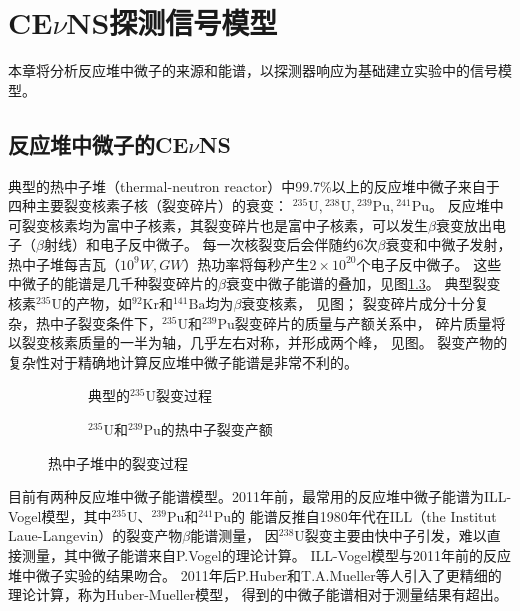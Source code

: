 
\chapter{CE$\nu$NS探测信号模型}

本章将分析反应堆中微子的来源和能谱，以探测器响应为基础建立实验中的信号模型。

\section{反应堆中微子的CE$\nu$NS}

典型的热中子堆（thermal-neutron reactor）中99.7\%以上的反应堆中微子来自于四种主要裂变核素子核（裂变碎片）的衰变：
${}^{235}\mathrm{U},{}^{238}\mathrm{U},{}^{239}\mathrm{Pu},{}^{241}\mathrm{Pu}$\cite{juno_collaboration_tao_2020}。
反应堆中可裂变核素均为富中子核素，其裂变碎片也是富中子核素，可以发生$\beta$衰变放出电子（$\beta$射线）和电子反中微子。
每一次核裂变后会伴随约6次$\beta$衰变和中微子发射，热中子堆每吉瓦（$10^{9}\si{W},\si{GW}$）热功率将每秒产生$2\times10^{20}$个电子反中微子。
这些中微子的能谱是几千种裂变碎片的$\beta$衰变中微子能谱的叠加，见图\ref{fig:fission}。
典型裂变核素${}^{235}\mathrm{U}$的产物，如${}^{92}\mathrm{Kr}$和${}^{141}\mathrm{Ba}$均为$\beta$衰变核素，
见图；
裂变碎片成分十分复杂，热中子裂变条件下，${}^{235}\mathrm{U}$和${}^{239}\mathrm{Pu}$裂变碎片的质量与产额关系中，
碎片质量将以裂变核素质量的一半为轴，几乎左右对称，并形成两个峰\cite{crouch_fission-product_1977}，
见图。
裂变产物的复杂性对于精确地计算反应堆中微子能谱是非常不利的。

\begin{figure}
  \begin{subfigure}{.35\textwidth}
    \centering
    
    \caption{\label{fig:nuclear_fission} 典型的${}^{235}\mathrm{U}$裂变过程\cite{noauthor_nuclear_2021}}
  \end{subfigure}
  \begin{subfigure}{.65\textwidth}
    \centering
    
    \caption{\label{fig:fission_yield} ${}^{235}\mathrm{U}$和${}^{239}\mathrm{Pu}$的热中子裂变产额}
  \end{subfigure}
  \caption{\label{fig:fission} 热中子堆中的裂变过程}
\end{figure}

目前有两种反应堆中微子能谱模型。2011年前，最常用的反应堆中微子能谱为ILL-Vogel模型，其中${}^{235}\mathrm{U}$、${}^{239}\mathrm{Pu}$和${}^{241}\mathrm{Pu}$的
能谱反推自1980年代在ILL（the Institut Laue-Langevin）的裂变产物$\beta$能谱测量\cite{von_feilitzsch_experimental_1982,schreckenbach_determination_1985,hahn_antineutrino_1989}，
因${}^{238}\mathrm{U}$裂变主要由快中子引发，难以直接测量，其中微子能谱来自P.Vogel的理论计算\cite{p_vogel_neutrino_1989}。
ILL-Vogel模型与2011年前的反应堆中微子实验的结果吻合\cite{an_improved_2017}。
2011年后P.Huber和T.A.Mueller等人引入了更精细的理论计算\cite{huber_determination_2011,mueller_improved_2011}，称为Huber-Mueller模型，
得到的中微子能谱相对于测量结果有超出。

